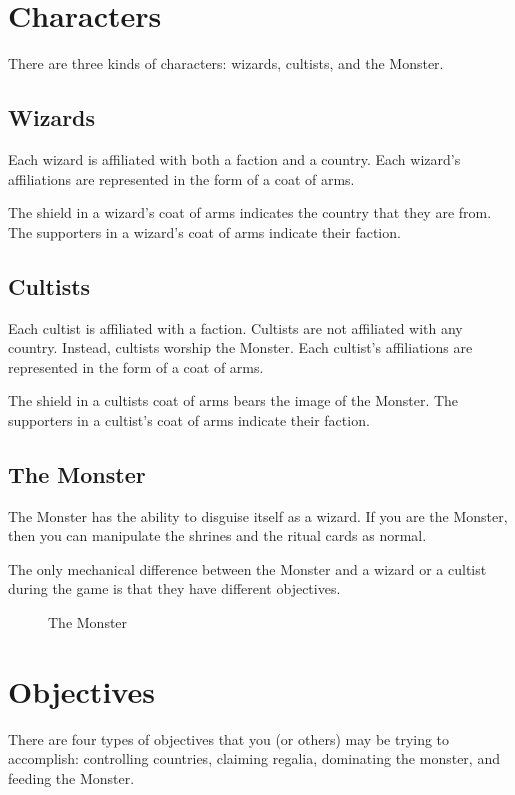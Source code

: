 \documentclass[10pt, parskip=half-, twoside]{scrartcl}
\begin{document}
\newpage

\section*{Characters}
There are three kinds of characters: wizards, cultists, and the Monster.

\subsection*{Wizards}
Each wizard is affiliated with both a faction and a country. Each wizard's affiliations are represented in the form of a coat of arms.

The shield in a wizard's coat of arms indicates the country that they are from. The supporters in a wizard's coat of arms indicate their faction.

\subsection*{Cultists}
Each cultist is affiliated with a faction. Cultists are not affiliated with any country. Instead, cultists worship the Monster. Each cultist's affiliations are represented in the form of a coat of arms.

The shield in a cultists coat of arms bears the image of the Monster. The supporters in a cultist's coat of arms indicate their faction.

\newpage

\subsection*{The Monster}
The Monster has the ability to disguise itself as a wizard. If you are the Monster, then you can manipulate the shrines and the ritual cards as normal.

The only mechanical difference between the Monster and a wizard or a cultist during the game is that they have different objectives.

\vfill

\begin{figure}[hb]
\centering
{}
\caption*{The Monster}
\end{figure}

\newpage

\section*{Objectives}
There are four types of objectives that you (or others) may be trying to accomplish: controlling countries, claiming regalia, dominating the monster, and feeding the Monster.
\end{document}
